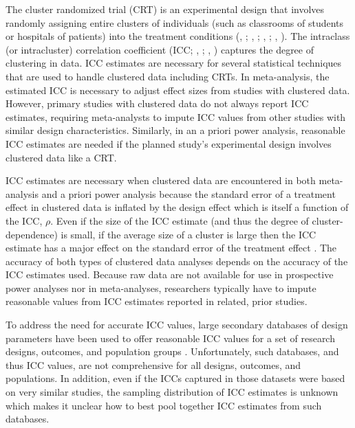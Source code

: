 
The cluster randomized trial (CRT) is an experimental design that involves randomly assigning entire clusters of individuals (such as classrooms of students or hospitals of patients) into the treatment conditions (,  ; , ; , ; , ). The intraclass (or intracluster) correlation coefficient (ICC; , ; , ) captures the degree of clustering in data. ICC estimates are necessary for several statistical techniques that are used to handle clustered data including CRTs. In meta-analysis, the estimated ICC is necessary to adjust effect sizes from studies with clustered data. However, primary studies with clustered data do not always report ICC estimates, requiring meta-analysts to impute ICC values from other studies with similar design characteristics. Similarly, in an a priori power analysis, reasonable ICC estimates are needed if the planned study's experimental design involves clustered data like a CRT. 

ICC estimates are necessary when clustered data are encountered in both meta-analysis and a priori power analysis because the standard error of a treatment effect in clustered data is inflated by the design effect which is itself a function of the ICC, $\rho$. Even if the size of the ICC estimate (and thus the degree of cluster-dependence) is small, if the average size of a cluster is large then the ICC estimate has a major effect on the standard error of the treatment effect \cite{cornfield1978}. The accuracy of both types of clustered data analyses depends on the accuracy of the ICC estimates used. Because raw data are not available for use in prospective power analyses nor in meta-analyses, researchers typically have to impute reasonable values from ICC estimates reported in related, prior studies. 

To address the need for accurate ICC values, large secondary databases of design parameters have been used to offer reasonable ICC values for a set of research designs, outcomes, and population groups \cite{hedgesIntraclassCorrelationValues2007a, hedges2013, hedbergReferenceValuesWithinDistrict2014, adams2004}. Unfortunately, such databases, and thus ICC values, are not comprehensive for all designs, outcomes, and populations. In addition, even if the ICCs captured in those datasets were based on very similar studies, the sampling distribution of ICC estimates is unknown which makes it unclear how to best pool together ICC estimates from such databases. 


